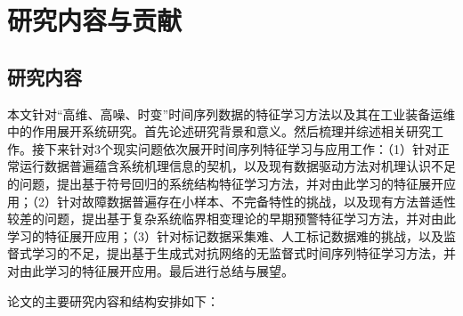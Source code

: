 
\section{研究内容与贡献}
\label{sec:content-contribution}

\subsection{研究内容}

本文针对“高维、高噪、时变”时间序列数据的特征学习方法以及其在工业装备运维中的作用展开系统研究。首先论述研究背景和意义。然后梳理并综述相关研究工作。接下来针对3个现实问题依次展开时间序列特征学习与应用工作：（1）针对正常运行数据普遍蕴含系统机理信息的契机，以及现有数据驱动方法对机理认识不足的问题，提出基于符号回归的系统结构特征学习方法，并对由此学习的特征展开应用；（2）针对故障数据普遍存在小样本、不完备特性的挑战，以及现有方法普适性较差的问题，提出基于复杂系统临界相变理论的早期预警特征学习方法，并对由此学习的特征展开应用；（3）针对标记数据采集难、人工标记数据难的挑战，以及监督式学习的不足，提出基于生成式对抗网络的无监督式时间序列特征学习方法，并对由此学习的特征展开应用。最后进行总结与展望。

论文的主要研究内容和结构安排如下：



